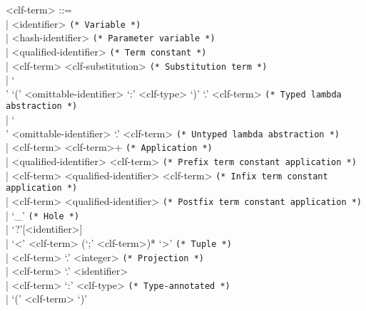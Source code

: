 \documentclass[11pt]{article}
\begin{document}
\begin{grammar}
<clf-term> ::= \hfill\\
| <identifier> \hfill \texttt{(* Variable *)}\\
| <hash-identifier> \hfill \texttt{(* Parameter variable *)}\\
| <qualified-identifier> \hfill \texttt{(* Term constant *)}\\
| <clf-term> <clf-substitution> \hfill \texttt{(* Substitution term *)}\\
| `\\' `(' <omittable-identifier> `:' <clf-type> `)' `.' <clf-term> \hfill \texttt{(* Typed lambda abstraction *)}\\
| `\\' <omittable-identifier> `.' <clf-term> \hfill \texttt{(* Untyped lambda abstraction *)}\\
| <clf-term> <clf-term>+ \hfill \texttt{(* Application *)}\\
| <qualified-identifier> <clf-term> \hfill \texttt{(* Prefix term constant application *)}\\
| <clf-term> <qualified-identifier> <clf-term> \hfill \texttt{(* Infix term constant application *)}\\
| <clf-term> <qualified-identifier> \hfill \texttt{(* Postfix term constant application *)}\\
| `_' \hfill \texttt{(* Hole *)}\\
| `?'[<identifier>]\\
| `<' <clf-term> (`;' <clf-term>)* `>' \hfill \texttt{(* Tuple *)}\\
| <clf-term> `.' <integer> \hfill \texttt{(* Projection *)}\\
| <clf-term> `.' <identifier>\\
| <clf-term> `:' <clf-type> \hfill \texttt{(* Type-annotated *)}\\
| `(' <clf-term> `)'


\end{grammar}
\end{document}

